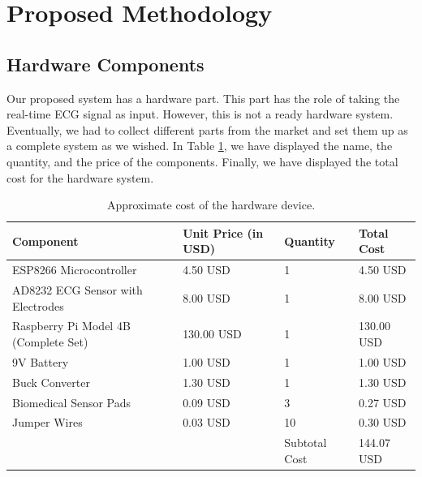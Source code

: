 \documentclass[conference]{IEEEtran}
\begin{document}
\section{Proposed Methodology}

\subsection{Hardware Components}

Our proposed system has a hardware part. This part has the role of taking the real-time ECG signal as input. However, this is not a ready hardware system. Eventually, we had to collect different parts from the market and set them up as a complete system as we wished. In Table \ref{table:Hardware-1}, we have displayed the name, the quantity, and the price of the components. Finally, we have displayed the total cost for the hardware system.

\begin{table}[!ht]
\centering
\caption{Approximate cost of the hardware device.}
\begin{tabularx}{\columnwidth}{|X|X|X|X|}
\hline
\textbf{Component} & \textbf{Unit Price (in USD)} & \textbf{Quantity} &  \textbf{Total Cost} \\
\hline
ESP8266 Microcontroller & 4.50 USD & 1 & 4.50 USD\\
\hline
AD8232 ECG Sensor with Electrodes & 8.00 USD & 1 & 8.00 USD\\
\hline
Raspberry Pi Model 4B (Complete Set) & 130.00 USD & 1 & 130.00 USD \\
\hline
9V Battery & 1.00 USD & 1 & 1.00 USD\\
\hline
Buck Converter & 1.30 USD & 1 & 1.30 USD\\
\hline
Biomedical Sensor Pads & 0.09 USD & 3 & 0.27 USD \\
\hline
Jumper Wires & 0.03 USD & 10 & 0.30 USD\\
\hline
 & & Subtotal Cost & 144.07 USD\\
\hline
\end{tabularx}
\label{table:Hardware-1}
\end{table}
 
\end{document}
